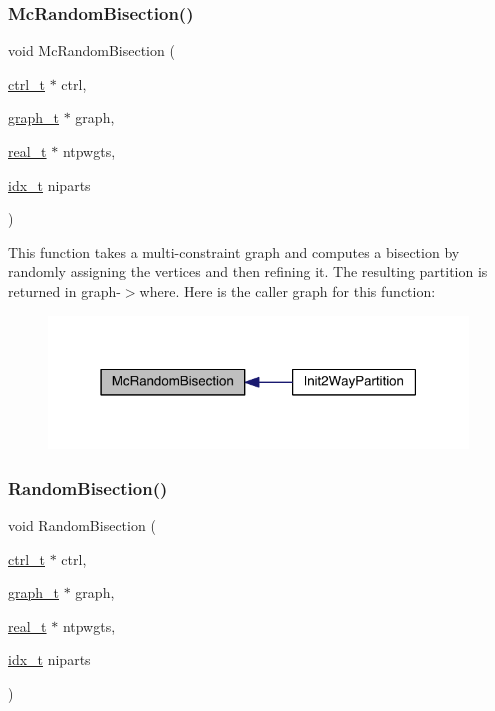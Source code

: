 \subsubsection{\texorpdfstring{Mc\+Random\+Bisection()}{McRandomBisection()}}
{\footnotesize\ttfamily void Mc\+Random\+Bisection (\begin{DoxyParamCaption}\item[{\hyperlink{a00742}{ctrl\+\_\+t} $\ast$}]{ctrl,  }\item[{\hyperlink{a00734}{graph\+\_\+t} $\ast$}]{graph,  }\item[{\hyperlink{a00876_a1924a4f6907cc3833213aba1f07fcbe9}{real\+\_\+t} $\ast$}]{ntpwgts,  }\item[{\hyperlink{a00876_aaa5262be3e700770163401acb0150f52}{idx\+\_\+t}}]{niparts }\end{DoxyParamCaption})}

This function takes a multi-\/constraint graph and computes a bisection by randomly assigning the vertices and then refining it. The resulting partition is returned in graph-\/$>$where. Here is the caller graph for this function\+:\nopagebreak
\begin{figure}[H]
\begin{center}
\leavevmode
\includegraphics[width=316pt]{a00903_a3ac013a2933e687d40aee2496120367e_icgraph}
\end{center}
\end{figure}
\mbox{\label{a00903_ad9f0573a18d3fcfa45d73c3bef80e5f8}} 
\subsubsection{\texorpdfstring{Random\+Bisection()}{RandomBisection()}}
{\footnotesize\ttfamily void Random\+Bisection (\begin{DoxyParamCaption}\item[{\hyperlink{a00742}{ctrl\+\_\+t} $\ast$}]{ctrl,  }\item[{\hyperlink{a00734}{graph\+\_\+t} $\ast$}]{graph,  }\item[{\hyperlink{a00876_a1924a4f6907cc3833213aba1f07fcbe9}{real\+\_\+t} $\ast$}]{ntpwgts,  }\item[{\hyperlink{a00876_aaa5262be3e700770163401acb0150f52}{idx\+\_\+t}}]{niparts }\end{DoxyParamCaption})}

